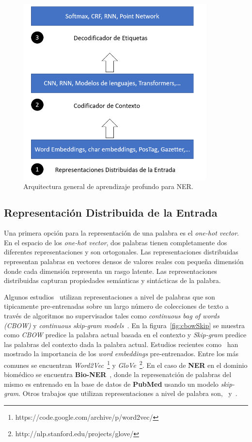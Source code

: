 \begin{figure}[h!]
	\centering
	\includegraphics[width = 10cm]{Imagenes/NERDeep.png}
	\caption{Arquitectura general de aprendizaje profundo para NER.}\label{fig:NerDeepBased}
\end{figure}

\subsection{Representaci\'on Distribuida de la Entrada}

Una primera opci\'on para la representaci\'on de una palabra es el \emph{one-hot vector}. En el espacio de los \emph{one-hot vector}, dos palabras tienen completamente dos diferentes representaciones y son ortogonales. Las representaciones distribuidas representan palabras en vectores densos de valores reales con peque\~na dimensi\'on donde cada dimensi\'on representa un rasgo latente. Las representaciones distribuidas capturan propiedades sem\'anticas y sint\'acticas de la palabra.    

Algunos estudios~\cite{strubell2017fast} utilizan representaciones a nivel de palabras que son tipicamente pre-entrenadas sobre un largo n\'umero de colecciones de texto a trav\'es de algoritmos no supervisados tales como \emph{continuous bag of words (CBOW)} y \emph{continuous skip-gram models}~\cite{mikolov2013efficient}. En la figura~\ref{fig:cbowSkip} se muestra como \emph{CBOW} predice la palabra actual basada en el contexto y \emph{Skip-gram} predice las palabras del contexto dada la palabra actual. Estudios recientes como~\cite{yang2018design} han mostrado la importancia de los \emph{word embeddings} pre-entrenados. Entre los m\'as comunes se encuentran \emph{Word2Vec}~\footnote{https://code.google.com/archive/p/word2vec/} y \emph{GloVe}~\footnote{http://nlp.stanford.edu/projects/glove/}. En el caso de \textbf{NER} en el dominio biom\'edico se encuentra \textbf{Bio-NER}~\cite{yao2015biomedical}, donde la represenatci\'on de palabras del mismo es entrenado en la base de datos de \textbf{PubMed} usando un modelo \emph{skip-gram}. Otros trabajos que utilizan  representaciones a nivel de palabra son,~\cite{ma2016end} y~\cite{wang2018code}.

